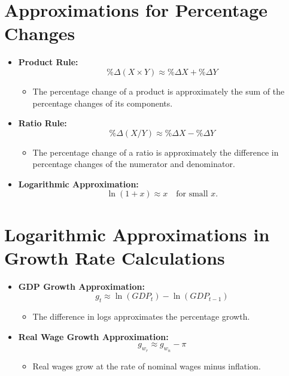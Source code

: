 \documentclass[a4paper, 11pt]{article}
\begin{document}
\section{Approximations for Percentage Changes}
\begin{itemize}
    \item \textbf{Product Rule:}
    \[ \%\Delta(X\times Y)\approx\%\Delta X + \%\Delta Y \]
    \begin{itemize}
        \item The percentage change of a product is approximately the sum of the percentage changes of its components.
    \end{itemize}
    \item \textbf{Ratio Rule:}
    \[ \%\Delta(X/Y)\approx\%\Delta X - \%\Delta Y \]
    \begin{itemize}
        \item The percentage change of a ratio is approximately the difference in percentage changes of the numerator and denominator.
    \end{itemize}
    \item \textbf{Logarithmic Approximation:}
    \[ \ln{(1+x)}\approx x \quad \text{for small } x. \]
\end{itemize}

\section{Logarithmic Approximations in Growth Rate Calculations}
\begin{itemize}
    \item \textbf{GDP Growth Approximation:}
    \[ g_t\approx\ln{(GDP_t)}-\ln{(GDP_{t-1})} \]
    \begin{itemize}
        \item The difference in logs approximates the percentage growth.
    \end{itemize}
    \item \textbf{Real Wage Growth Approximation:}
    \[ g_{w_r}\approx g_{w_n}-\pi \]
    \begin{itemize}
        \item Real wages grow at the rate of nominal wages minus inflation.
    \end{itemize}
\end{itemize}
\end{document}
